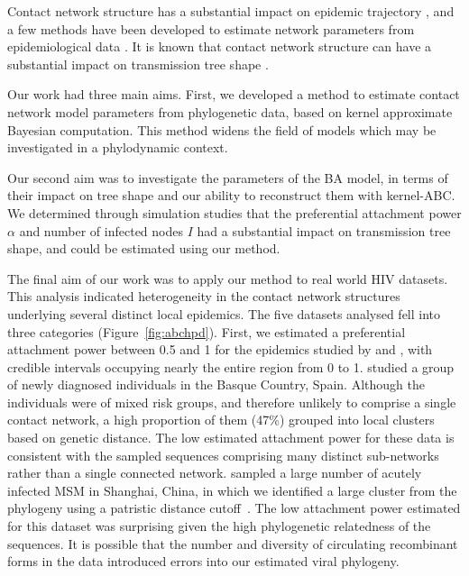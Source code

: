 Contact network structure has a substantial impact on epidemic trajectory
\autocite{barthelemy2005dynamical, volz2007susceptible, volz2008sir}, and a few
methods have been developed to estimate network parameters from epidemiological
data \autocite{volz2007susceptible, britton2002bayesian,
groendyke2011bayesian}. It is known that contact network structure can have a
substantial impact on transmission tree shape \autocite{o2010contact,
robinson2013dynamics, leventhal2012inferring, colijn2014phylogenetic,
villandre2016assessment}.

Our work had three main aims. First, we developed a method to estimate contact
network model parameters from phylogenetic data, based on kernel approximate
Bayesian computation. This method widens the field of models which may be
investigated in a phylodynamic context.

Our second aim was to investigate the parameters of the \gls{BA} model, in
terms of their impact on tree shape and our ability to reconstruct them with
kernel-\gls{ABC}. We determined through simulation studies that the
preferential attachment power $\alpha$ and number of infected nodes $I$ had a
substantial impact on transmission tree shape, and could be estimated using our
method.

The final aim of our work was to apply our method to real world \gls{HIV}
datasets. This analysis indicated heterogeneity in the contact network
structures underlying several distinct local epidemics. The five datasets
analysed fell into three categories (Figure~\ref{fig:abchpd}). First, we
estimated a preferential attachment power between 0.5 and 1 for the epidemics
studied by \textcite{cuevas2009hiv} and \textcite{li2015hiv}, with credible
intervals occupying nearly the entire region from 0 to 1.
\citeauthor{cuevas2009hiv} studied a group of newly diagnosed individuals in
the Basque Country, Spain. Although the individuals were of mixed risk groups,
and therefore unlikely to comprise a single contact network, a high proportion
of them (47\%) grouped into local clusters based on genetic distance. The low
estimated attachment power for these data is consistent with the sampled
sequences comprising many distinct sub-networks rather than a single connected
network. \citeauthor{li2015hiv} sampled a large number of acutely infected MSM
in Shanghai, China, in which we identified a large cluster from the phylogeny
using a patristic distance cutoff~\autocite{poon2015impact}. The low attachment
power estimated for this dataset was surprising given the high phylogenetic
relatedness of the sequences. It is possible that the number and diversity of
circulating recombinant forms in the data introduced errors into our estimated
viral phylogeny.

